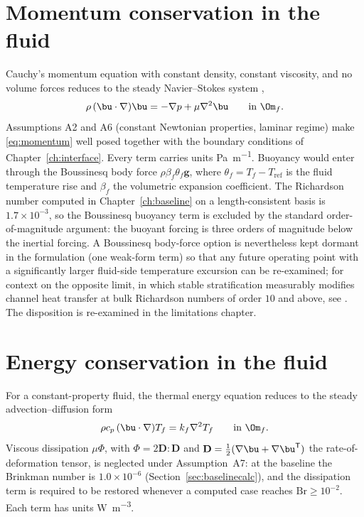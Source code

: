 \section{Momentum conservation in the fluid}
Cauchy's momentum equation with constant density, constant viscosity, and no volume forces reduces
to the steady Navier--Stokes system \cite{bird1960transport},
\begin{equation}
\rho\,(\bu\cdot\nabla)\bu = -\nabla p + \mu\nabla^2\bu \qquad \text{in } \Om_f .
\label{eq:momentum}
\end{equation}
Assumptions A2 and A6 (constant Newtonian properties, laminar regime) make \eqref{eq:momentum}
well posed together with the boundary conditions of Chapter~\ref{ch:interface}. Every term carries
units \si{\pascal\per\metre}. Buoyancy would enter through the Boussinesq body force
$\rho\beta_f\theta_f\mathbf g$, where $\theta_f=T_f-T_{\mathrm{ref}}$ is the fluid temperature rise
and $\beta_f$ the volumetric expansion coefficient. The Richardson number computed in
Chapter~\ref{ch:baseline} on a length-consistent basis is $1.7\times10^{-3}$, so the Boussinesq
buoyancy term is excluded by the standard order-of-magnitude argument: the buoyant forcing is three
orders of magnitude below the inertial forcing. A Boussinesq body-force option is nevertheless kept
dormant in the formulation (one weak-form term) so that any future operating point with a
significantly larger fluid-side temperature excursion can be re-examined; for context on the
opposite limit, in which stable stratification measurably modifies channel heat transfer at bulk
Richardson numbers of order $10$ and above, see \cite{draskic2025stability}. The disposition is
re-examined in the limitations chapter.

\section{Energy conservation in the fluid}
For a constant-property fluid, the thermal energy equation reduces to the steady
advection--diffusion form \cite{bird1960transport}
\begin{equation}
\rho c_p\,(\bu\cdot\nabla)T_f = k_f\nabla^2 T_f \qquad \text{in } \Om_f .
\label{eq:fluidenergy}
\end{equation}
Viscous dissipation $\mu\Phi$, with $\Phi=2\mathbf D:\mathbf D$ and
$\mathbf D=\tfrac12(\nabla\bu+\nabla\bu^{\mathsf T})$ the rate-of-deformation tensor, is neglected
under Assumption~A7: at the baseline the Brinkman number is $1.0\times10^{-6}$
(Section~\ref{sec:baselinecalc}), and the dissipation term is required to be restored whenever a
computed case reaches $\mathrm{Br}\ge10^{-2}$. Each term has units \si{\watt\per\cubic\metre}.


